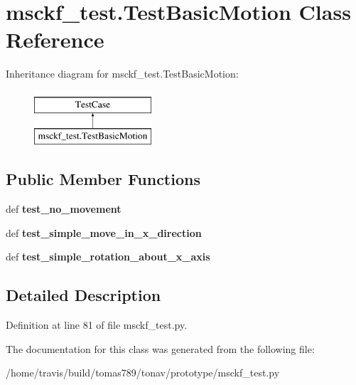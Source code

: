 \hypertarget{classmsckf__test_1_1_test_basic_motion}{\section{msckf\-\_\-test.\-Test\-Basic\-Motion Class Reference}
\label{classmsckf__test_1_1_test_basic_motion}
}
Inheritance diagram for msckf\-\_\-test.\-Test\-Basic\-Motion\-:\begin{figure}[H]
\begin{center}
\leavevmode
\includegraphics[height=2.000000cm]{classmsckf__test_1_1_test_basic_motion}
\end{center}
\end{figure}
\subsection*{Public Member Functions}
\begin{DoxyCompactItemize}
\item 
\hypertarget{classmsckf__test_1_1_test_basic_motion_a404257b0be26cb61f9a40c86c3ed9038}{def {\bfseries test\-\_\-no\-\_\-movement}}\label{classmsckf__test_1_1_test_basic_motion_a404257b0be26cb61f9a40c86c3ed9038}

\item 
\hypertarget{classmsckf__test_1_1_test_basic_motion_acef0d837aaee3cc362efeed06df5a5c2}{def {\bfseries test\-\_\-simple\-\_\-move\-\_\-in\-\_\-x\-\_\-direction}}\label{classmsckf__test_1_1_test_basic_motion_acef0d837aaee3cc362efeed06df5a5c2}

\item 
\hypertarget{classmsckf__test_1_1_test_basic_motion_a2efc71e9537bf2671bbe4174c57895b7}{def {\bfseries test\-\_\-simple\-\_\-rotation\-\_\-about\-\_\-x\-\_\-axis}}\label{classmsckf__test_1_1_test_basic_motion_a2efc71e9537bf2671bbe4174c57895b7}

\end{DoxyCompactItemize}


\subsection{Detailed Description}


Definition at line 81 of file msckf\-\_\-test.\-py.



The documentation for this class was generated from the following file\-:\begin{DoxyCompactItemize}
\item 
/home/travis/build/tomas789/tonav/prototype/msckf\-\_\-test.\-py\end{DoxyCompactItemize}
